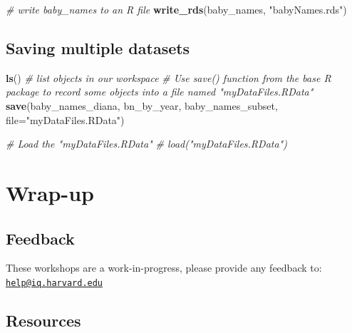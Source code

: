 \documentclass[]{book}
\newenvironment{Shaded}{\begin{snugshade}}{\end{snugshade}}
\newcommand{\CommentTok}[1]{\textcolor[rgb]{0.56,0.35,0.01}{\textit{#1}}}
\newcommand{\DataTypeTok}[1]{\textcolor[rgb]{0.13,0.29,0.53}{#1}}
\newcommand{\KeywordTok}[1]{\textcolor[rgb]{0.13,0.29,0.53}{\textbf{#1}}}
\newcommand{\NormalTok}[1]{#1}
\newcommand{\StringTok}[1]{\textcolor[rgb]{0.31,0.60,0.02}{#1}}
\begin{document}
\begin{Shaded}
\begin{Highlighting}[]
\CommentTok{# write baby_names to an R file}
\KeywordTok{write_rds}\NormalTok{(baby_names, }\StringTok{"babyNames.rds"}\NormalTok{)}
\end{Highlighting}
\end{Shaded}

\hypertarget{saving-multiple-datasets}{%
\subsection{Saving multiple datasets}\label{saving-multiple-datasets}}

\begin{Shaded}
\begin{Highlighting}[]
\KeywordTok{ls}\NormalTok{() }\CommentTok{# list objects in our workspace}
\CommentTok{# Use save() function from the base R package to record some objects into a file named "myDataFiles.RData"}
\KeywordTok{save}\NormalTok{(baby_names_diana, bn_by_year, baby_names_subset, }\DataTypeTok{file=}\StringTok{"myDataFiles.RData"}\NormalTok{)  }
\end{Highlighting}
\end{Shaded}

\begin{Shaded}
\begin{Highlighting}[]
\CommentTok{# Load the "myDataFiles.RData"}
\CommentTok{# load("myDataFiles.RData") }
\end{Highlighting}
\end{Shaded}

\hypertarget{wrap-up-1}{%
\section{Wrap-up}\label{wrap-up-1}}

\hypertarget{feedback-1}{%
\subsection{Feedback}\label{feedback-1}}

These workshops are a work-in-progress, please provide any feedback to: \href{mailto:help@iq.harvard.edu}{\nolinkurl{help@iq.harvard.edu}}

\hypertarget{resources-2}{%
\subsection{Resources}\label{resources-2}}
\end{document}
